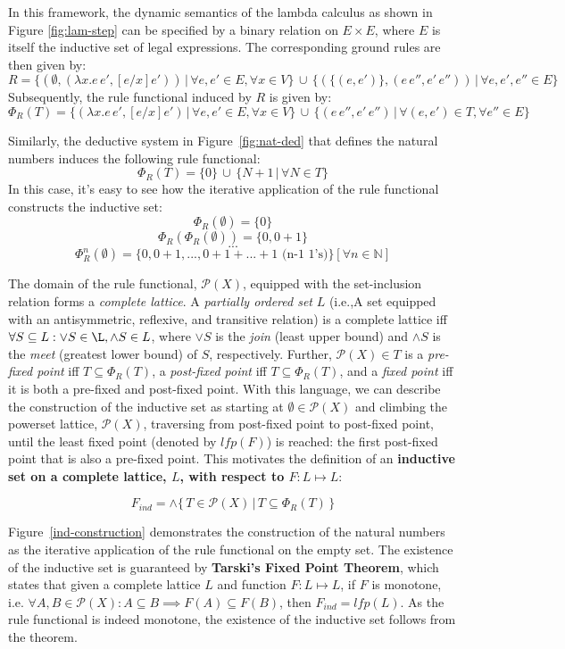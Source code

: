 \documentclass[titlepage]{article}
\begin{document}
In this framework, the dynamic semantics of the lambda calculus as shown in Figure \ref{fig:lam-step} can be specified by a binary relation on $E \times E$, where $E$ is itself the inductive set of legal expressions. The corresponding ground rules are then given by: 
$$R = \{(\emptyset ,(\lambda x.e \, e',[e/x]e')) \,|\, \forall e,e' \in E, \forall x \in V\} \,\cup\, \{(\{(e,e')\},(e\,e'',e'\,e'')) \,|\, \forall e,e',e'' \in E\}$$ 
Subsequently, the rule functional induced by $R$ is given by: 
$$\Phi_R(T) = \{(\lambda x.e \, e',[e/x]e') \,|\, \forall e,e' \in E, \forall x \in V \} \,\cup\, \{(e\,e'',e'\,e'') \,|\, \forall (e,e') \in T, \forall e'' \in E\} $$

Similarly, the deductive system in Figure~\ref{fig:nat-ded} that defines the natural numbers induces the following rule functional: 
$$\Phi_R(T) = \{0\} \,\cup\, \{N + 1 \,|\, \forall N \in T\} $$
In this case, it's easy to see how the iterative application of the rule functional constructs the inductive set:
$$\Phi_R(\emptyset) = \{0\}$$
$$\Phi_R(\Phi_R(\emptyset)) = \{0,0 + 1\}$$
$$...$$
$$\Phi_R^n(\emptyset) = \{0,0 + 1, ..., 0 + 1 + ... + 1 \text{ (n-1 1's)}\} [\forall n \in \mathbb{N}]$$

The domain of the rule functional, $\mathcal{P}(X)$, equipped with the set-inclusion relation forms a \textit{complete lattice}. A \textit{partially ordered set} $L$ (i.e.,A set equipped with an antisymmetric, reflexive, and transitive relation) is a complete lattice iff $\forall S \subseteq L: \vee S \in \L, \wedge S \in L$, where $\vee S$ is the \textit{join} (least upper bound) and $\wedge S$ is the \textit{meet} (greatest lower bound) of $S$, respectively. Further, $\mathcal{P}(X) \in T$ is a \textit{pre-fixed point} iff $T \subseteq \Phi_R(T)$, a \textit{post-fixed point} iff $T \subseteq \Phi_R(T)$, and a \textit{fixed point} iff it is both a pre-fixed and post-fixed point. With this language, we can describe the construction of the inductive set as starting at $\emptyset \in \mathcal{P}(X)$ and climbing the powerset lattice, $\mathcal{P}(X)$, traversing from post-fixed point to post-fixed point, until the least fixed point (denoted by $lfp(F)$) is reached: the first post-fixed point that is also a pre-fixed point. This motivates the definition of an \textbf{inductive set on a complete lattice, $L$, with respect to $F:L \mapsto L$}: 

$$F_{ind} = \wedge \{\, T \in \mathcal{P}(X) \,|\, T \subseteq \Phi_R(T) \,\}$$ 

Figure~\ref{ind-construction} demonstrates the construction of the natural numbers as the iterative application of the rule functional on the empty set. The existence of the inductive set is guaranteed by \textbf{Tarski’s Fixed Point Theorem}, which states that given a complete lattice $L$ and function $F : L \mapsto L$, if $F$ is monotone, i.e. $\forall A,B \in \mathcal{P}(X) : A \subseteq B \implies F(A) \subseteq F(B)$, then $F_{ind} = lfp(L)$. As the rule functional is indeed monotone, the existence of the inductive set follows from the theorem.
\end{document}
